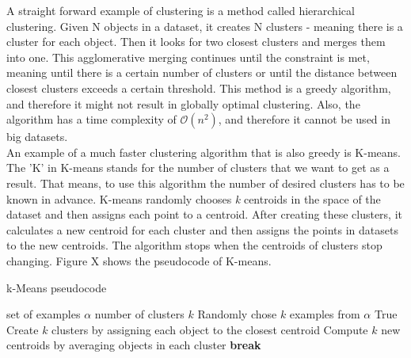 \documentclass[thesis=B,english]{FITthesis}[2012/10/20]
\begin{document}
A straight forward example of clustering is a method called hierarchical clustering.
Given N objects in a dataset, it creates N clusters - meaning there is a cluster for each object.
Then it looks for two closest clusters and merges them into one.                  
This agglomerative merging continues until the constraint is met, meaning until there is a certain number of clusters or until the distance between closest clusters exceeds a certain threshold.
This method is a greedy algorithm, and therefore it might not result in globally optimal clustering.
Also, the algorithm has a time complexity of $\mathcal{O}(n^2)$, and therefore it cannot be used in big datasets. \\
                                                                                  
An example of a much faster clustering algorithm that is also greedy is K-means. 
The 'K' in K-means stands for the number of clusters that we want to get as a result.
That means, to use this algorithm the number of desired clusters has to be known in advance.
K-means randomly chooses \textit{k} centroids in the space of the dataset and then assigns each point to a centroid.
After creating these clusters, it calculates a new centroid for each cluster and then assigns the points in datasets to the new centroids.
The algorithm stops when the centroids of clusters stop changing.                 
Figure X shows the pseudocode of K-means.                                         
\begin{algorithm}                                                                 
    \caption{k-Means pseudocode}                                                  
    \label{k_mean_pseudocode}                                                     
    \begin{algorithmic}[1]                                                        
        \INPUT set of examples $\alpha$  number of clusters $k$                   
        \STATE Randomly chose $k$ examples from $\alpha$                          
        \WHILE True                                                               
            \STATE Create $k$ clusters by assigning each object to the closest centroid
            \STATE Compute $k$ new centroids by averaging objects in each cluster 
                \STATE \textbf{break}                                             
            \ENDIF                                                                
        \ENDWHILE                                                                 
    \end{algorithmic}                                                             
\end{algorithm}                                                                   
                                                                                  
\end{document}
